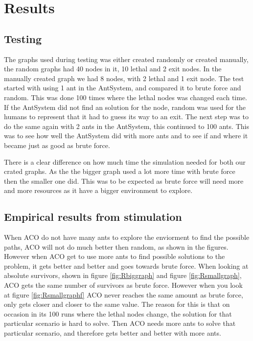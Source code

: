 \chapter{Results}
\label{ch:results}

\section{Testing}
The graphs used during testing was either created randomly or created manually, the random graphs had 40 nodes in it, 10 lethal and 2 exit nodes. In the manually created graph we had 8 nodes, with 2 lethal and 1 exit node. The test started with using 1 ant in the AntSystem, and compared it to brute force and random. This was done 100 times where the lethal nodes was changed each time. If the AntSystem did not find an solution for the node, random was used for the humans to represent that it had to guess its way to an exit. The next step was to do the same again with 2 ants in the AntSystem, this continued to 100 ants. This was to see how well the AntSystem did with more ants and to see if and where it became just as good as brute force.

There is a clear difference on how much time the simulation needed for both our crated graphs. As the the bigger graph used a lot more time with brute force then the smaller one did. This was to be expected as brute force will need more and more resources as it have a bigger environment to explore.

\newpage

\section{Empirical results from stimulation}

When ACO do not have many ants to explore the enviorment to find the possible paths, ACO will not do much better then random, as shown in the figures. However when ACO get to use more ants to find possible solutions to the problem, it gets better and better and goes towards brute force. When looking at absolute survivors, shown in figure \ref{fig:Rbiggraph} and figure \ref{fig:Rsmallgraph}, ACO gets the same number of survivors as brute force. However when you look at figure \ref{fig:Rsmallgraphf} ACO never reaches the same amount as brute force, only gets closer and closer to the same value. The reason for this is that on occasion in its 100 runs where the lethal nodes change, the solution for that particular scenario is hard to solve. Then ACO needs more ants to solve that particular scenario, and therefore gets better and better with more ants.

